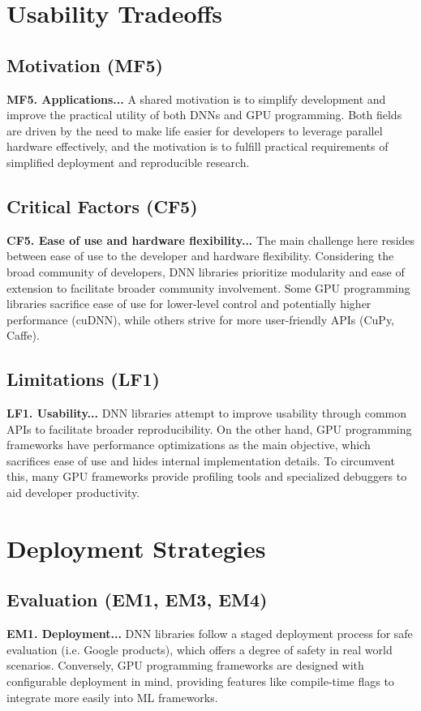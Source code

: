 \section{Usability Tradeoffs}
\subsection*{Motivation (MF5)}
\textbf{MF5. Applications...} A shared motivation is to simplify development and improve the practical utility of both DNNs and GPU programming.
Both fields are driven by the need to make life easier for developers to leverage parallel hardware effectively,
and the motivation is to fulfill practical requirements of simplified deployment and reproducible research.

\subsection*{Critical Factors (CF5)}
\textbf{CF5. Ease of use and hardware flexibility...}
The main challenge here resides between ease of use to the developer and hardware flexibility.
Considering the broad community of developers, DNN libraries prioritize modularity and ease of
extension to facilitate broader community involvement. Some GPU programming libraries sacrifice ease of use for lower-level control
and potentially higher performance (cuDNN), while others strive for more user-friendly APIs (CuPy, Caffe).

\subsection*{Limitations (LF1)}
\textbf{LF1. Usability...}
DNN libraries attempt to improve usability through common APIs to facilitate broader
reproducibility. On the other hand, GPU programming frameworks have performance optimizations as
the main objective, which sacrifices ease of use and hides internal implementation details.
To circumvent this, many GPU frameworks provide profiling tools and specialized debuggers to aid
developer productivity.

\section{Deployment Strategies}
\subsection*{Evaluation (EM1, EM3, EM4)}
\textbf{EM1. Deployment...}
DNN libraries follow a staged deployment process for safe evaluation (i.e. Google products), which
offers a degree of safety in real world scenarios. Conversely, GPU programming frameworks are
designed with configurable deployment in mind, providing features like compile-time flags to
integrate more easily into ML frameworks.

